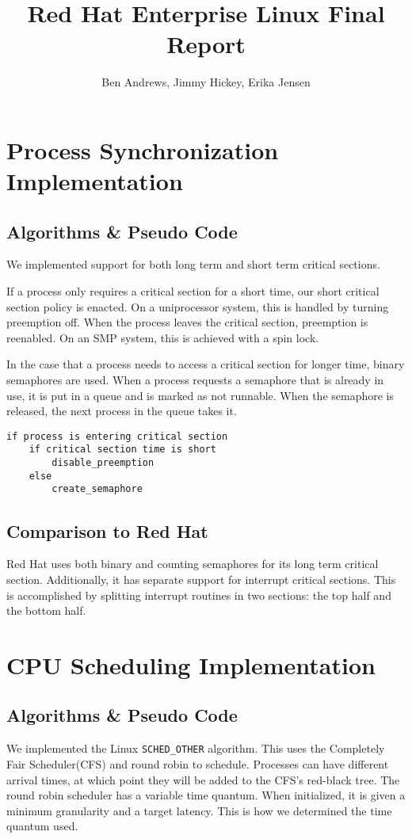 \documentclass[12pt]{article}
\title{Red Hat Enterprise Linux Final Report}
\author{Ben Andrews, Jimmy Hickey, Erika Jensen}
\begin{document}
\maketitle
\tableofcontents
\clearpage

\doublespacing

\section{Process Synchronization Implementation}
\subsection{Algorithms \& Pseudo Code}
We implemented support for both long term and short term critical sections. 

If a process only requires a critical section for a short time, our short critical section policy is enacted. On a uniprocessor system, this is handled by turning preemption off. When the process leaves the critical section, preemption is reenabled. On an SMP system, this is achieved with a spin lock.

In the case that a process needs to access a critical section for longer time, binary semaphores are used. When a process requests a semaphore that is already in use, it is put in a queue and is marked as not runnable. When the semaphore is released, the next process in the queue takes it.

\singlespacing
\begin{lstlisting}
if process is entering critical section
	if critical section time is short
		disable_preemption
	else
		create_semaphore
\end{lstlisting}
\doublespacing
\subsection{Comparison to Red Hat }
Red Hat uses both binary and counting semaphores for its long term critical section. Additionally, it has separate support for interrupt critical sections. This is accomplished by splitting interrupt routines in two sections: the top half and the bottom half. 

\section{CPU Scheduling Implementation}
\subsection{Algorithms \& Pseudo Code}
We implemented the Linux \lstinline|SCHED_OTHER| algorithm. This uses the Completely Fair Scheduler(CFS) and round robin to schedule. Processes can have different arrival times, at which point they will be added to the CFS's red-black tree. The round robin scheduler has a variable time quantum. When initialized, it is given a minimum granularity and a target latency. This is how we determined the time quantum used.
\end{document}
